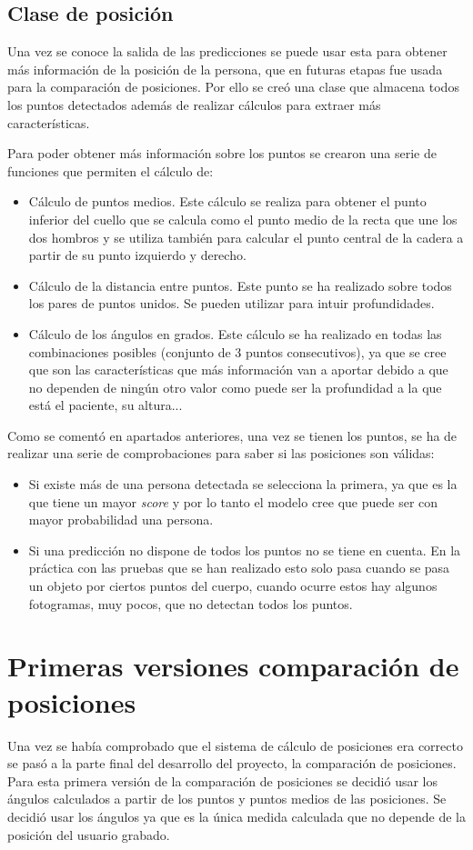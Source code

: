 \subsection{Clase de posición}
Una vez se conoce la salida de las predicciones se puede usar esta para obtener más información de la posición de la persona, que en futuras etapas fue usada para la comparación de posiciones. Por ello se creó una clase que almacena todos los puntos detectados además de realizar cálculos para extraer más características.

Para poder obtener más información sobre los puntos se crearon una serie de funciones que permiten el cálculo de:
\begin{itemize}
	\item Cálculo de puntos medios. Este cálculo se realiza para obtener el punto inferior del cuello que se calcula como el punto medio de la recta que une los dos hombros y se utiliza también para calcular el punto central de la cadera a partir de su punto izquierdo y derecho.
	\item Cálculo de la distancia entre puntos. Este punto se ha realizado sobre todos los pares de puntos unidos. Se pueden utilizar para intuir profundidades.
	\item Cálculo de los ángulos en grados. Este cálculo se ha realizado en todas las combinaciones posibles (conjunto de 3 puntos consecutivos), ya que se cree que son las características que más información van a aportar debido a que no dependen de ningún otro valor como puede ser la profundidad a la que está el paciente, su altura...
\end{itemize}

Como se comentó en apartados anteriores, una vez se tienen los puntos, se ha de realizar una serie de comprobaciones para saber si las posiciones son válidas:
\begin{itemize}
	\item Si existe más de una persona detectada se selecciona la primera, ya que es la que tiene un mayor \textit{score} y por lo tanto el modelo cree que puede ser con mayor probabilidad una persona.
	\item Si una predicción no dispone de todos los puntos no se tiene en cuenta. En la práctica con las pruebas que se han realizado esto solo pasa cuando se pasa un objeto por ciertos puntos del cuerpo, cuando ocurre estos hay algunos fotogramas, muy pocos, que no detectan todos los puntos.
\end{itemize}

\section{Primeras versiones comparación de posiciones}
Una vez se había comprobado que el sistema de cálculo de posiciones era correcto se pasó a la parte final del desarrollo del proyecto, la comparación de posiciones. Para esta primera versión de la comparación de posiciones se decidió usar los ángulos calculados a partir de los puntos y puntos medios de las posiciones. Se decidió usar los ángulos ya que es la única medida calculada que no depende de la posición del usuario grabado.

